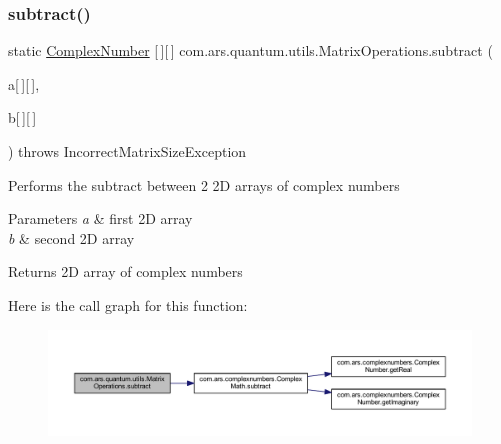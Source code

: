 \subsubsection{\texorpdfstring{subtract()}{subtract()}\hspace{0.1cm}{\footnotesize\ttfamily [2/2]}}
{\footnotesize\ttfamily static \hyperlink{classcom_1_1ars_1_1complexnumbers_1_1_complex_number}{Complex\+Number} \mbox{[}$\,$\mbox{]}\mbox{[}$\,$\mbox{]} com.\+ars.\+quantum.\+utils.\+Matrix\+Operations.\+subtract (\begin{DoxyParamCaption}\item[{\hyperlink{classcom_1_1ars_1_1complexnumbers_1_1_complex_number}{Complex\+Number}}]{a\mbox{[}$\,$\mbox{]}\mbox{[}$\,$\mbox{]},  }\item[{\hyperlink{classcom_1_1ars_1_1complexnumbers_1_1_complex_number}{Complex\+Number}}]{b\mbox{[}$\,$\mbox{]}\mbox{[}$\,$\mbox{]} }\end{DoxyParamCaption}) throws Incorrect\+Matrix\+Size\+Exception\hspace{0.3cm}{\ttfamily [static]}}

Performs the subtract between 2 2D arrays of complex numbers


\begin{DoxyParams}{Parameters}
{\em a} & first 2D array \\
\hline
{\em b} & second 2D array \\
\hline
\end{DoxyParams}
\begin{DoxyReturn}{Returns}
2D array of complex numbers 
\end{DoxyReturn}
Here is the call graph for this function\+:
\nopagebreak
\begin{figure}[H]
\begin{center}
\leavevmode
\includegraphics[width=350pt]{classcom_1_1ars_1_1quantum_1_1utils_1_1_matrix_operations_a99b64f57485b148b298a3a7e08c002f6_cgraph}
\end{center}
\end{figure}
\hypertarget{classcom_1_1ars_1_1quantum_1_1utils_1_1_matrix_operations_ae32f245d0796d98e4a10e3f213ae621a}{}\label{classcom_1_1ars_1_1quantum_1_1utils_1_1_matrix_operations_ae32f245d0796d98e4a10e3f213ae621a} 
